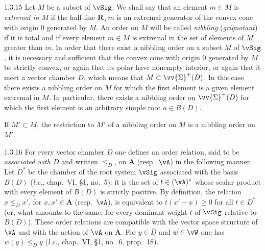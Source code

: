 \documentclass[12pt,a4paper,oneside,english]{smfart}
\makeatletter
\newcommand{\btanchor}[1]{\leavevmode\Hy@raisedlink{\hypertarget{bt:#1}{}}}
\theoremstyle{definition}
\theoremstyle{bt}
\makeatother
\begin{document}
\num{1.3.15}\btanchor{1.3.15} Let $M$ be a subset of $\vSig$. We shall say that an element
$m\in M$ is \emph{extremal in $M$} if the half-line $\mathbf{R}_{+}m$ is an extremal generator of the convex cone with origin $0$ generated by $M$. An order on $M$ will be called \emph{nibbling} (\emph{grignotant}) if it is total and if every element $m\in M$ is extremal in the set of elements of $M$ greater than $m$. In order that there exist a nibbling order on a subset $M$ of $\vSig$, it is necessary and sufficient that the convex cone with origin $0$ generated by $M$ be strictly convex, or again that its polar have nonempty interior, or again that it meet a vector chamber $D$, which means that $M\subset\vv{\Sigma}^{+}(D)$. In this case there exists a nibbling order on $M$ for which the first element is a given element extremal in $M$. In particular, there exists a nibbling order on $\vv{\Sigma}^{+}(D)$ for which the first element is an arbitrary simple root $a\in B(D)$.

If $M'\subset M$, the restriction to $M'$ of a nibbling order on $M$ is a nibbling order on $M'$.

\num{1.3.16}\btanchor{1.3.16} For every vector chamber $D$ one defines an order relation, said
to be \emph{associated with $D$} and written $\leqslant_{D}$, on $\mathbf{A}$ (resp.\ $\vA$) in the following manner. Let $D^{*}$ be the chamber of the root system $\vSig$ associated with the basis $B(D)$ (\emph{l.c.}, chap.~VI, \S1, no.~5): it is the set of $t\in(\vA)^{*}$ whose scalar product with every element of $B(D)$ is strictly positive. By definition, the relation $x\leqslant_{D}x'$, for $x,x'\in\mathbf{A}$ (resp.\ $\vA$), is equivalent to $t(x'-x)\geqslant0$ for all $t\in D^{*}$ (or, what amounts to the same, for every dominant weight $t$ of $\vSig$ relative to $B(D)$). These order relations are compatible with the vector space structure of $\vA$ and with the action of $\vA$ on $\mathbf{A}$. For $y\in\bar D$ and $w\in\vW$ one has $w(y)\leqslant_{D}y$ (\emph{l.c.}, chap.~VI, \S1, no.~6, prop.~18).
\par\endgroup
\end{document}
